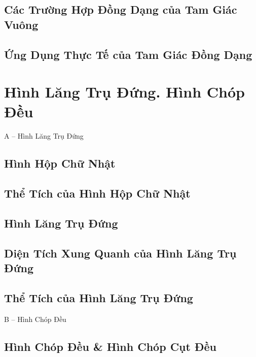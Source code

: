 \documentclass{article}
\numberwithin{equation}{section}
\begin{document}
\subsection{Các Trường Hợp Đồng Dạng của Tam Giác Vuông}

\subsection{Ứng Dụng Thực Tế của Tam Giác Đồng Dạng}


\section{Hình Lăng Trụ Đứng. Hình Chóp Đều}

\begin{center}
	\Large A -- Hình Lăng Trụ Đứng
\end{center}

\subsection{Hình Hộp Chữ Nhật}

\subsection{Thể Tích của Hình Hộp Chữ Nhật}

\subsection{Hình Lăng Trụ Đứng}

\subsection{Diện Tích Xung Quanh của Hình Lăng Trụ Đứng}

\subsection{Thể Tích của Hình Lăng Trụ Đứng}

\begin{center}
	\Large B -- Hình Chóp Đều
\end{center}

\subsection{Hình Chóp Đều \& Hình Chóp Cụt Đều}
\end{document}
